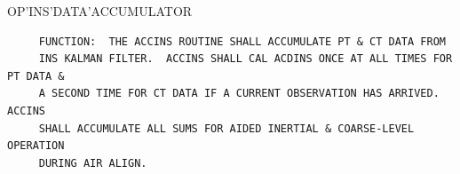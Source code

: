 \begin{frame}
OP'INS'DATA'ACCUMULATOR
\begin{verbatim}
     FUNCTION:  THE ACCINS ROUTINE SHALL ACCUMULATE PT & CT DATA FROM
     INS KALMAN FILTER.  ACCINS SHALL CAL ACDINS ONCE AT ALL TIMES FOR PT DATA &
     A SECOND TIME FOR CT DATA IF A CURRENT OBSERVATION HAS ARRIVED.  ACCINS
     SHALL ACCUMULATE ALL SUMS FOR AIDED INERTIAL & COARSE-LEVEL OPERATION
     DURING AIR ALIGN.

\end{verbatim}
\end{frame}
